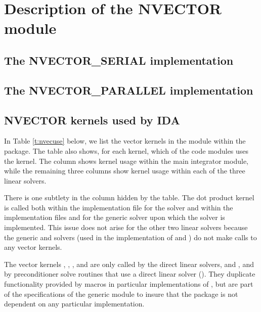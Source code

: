 \chapter{Description of the NVECTOR module}\label{s:nvector}


\section{The NVECTOR\_SERIAL implementation}\label{ss:nvec_ser}


\section{The NVECTOR\_PARALLEL implementation}\label{ss:nvec_par}


\section{NVECTOR kernels used by IDA}

In Table \ref{t:nvecuse} below, we list the vector kernels in the 
{\nvector} module within the {\ida} package.
The table also shows, for each kernel, which of the code modules uses
the kernel. The {\ida} column shows kernel usage within the main
integrator module, while the remaining three columns show kernel usage
within each of the three {\ida} linear solvers. 

There is one subtlety in the {\idaspgmr} column hidden by the table. 
The dot product kernel  is called both within the 
implementation file  for the {\idaspgmr} solver and within 
the implementation files  and  for the generic {\spgmr} 
solver upon which the {\idaspgmr} solver is implemented. 
This issue does not arise for the other 
two {\cvode} linear solvers because the generic {\dense} and {\band} solvers 
(used in the implementation of {\idadense} and {\idaband}) do not make calls to 
any vector kernels.

The vector kernels , , , and
 are only called by the {\cvode} direct linear solvers, 
{\idadense} and {\idaband}, and by preconditioner solve routines that use a 
direct linear solver ({\idabbdpre}). They duplicate 
functionality provided by macros in particular implementations of {\nvector},
but are part of the specifications of the generic {\nvector} module to insure 
that the {\ida} package is not dependent on any particular {\nvector} implementation.


